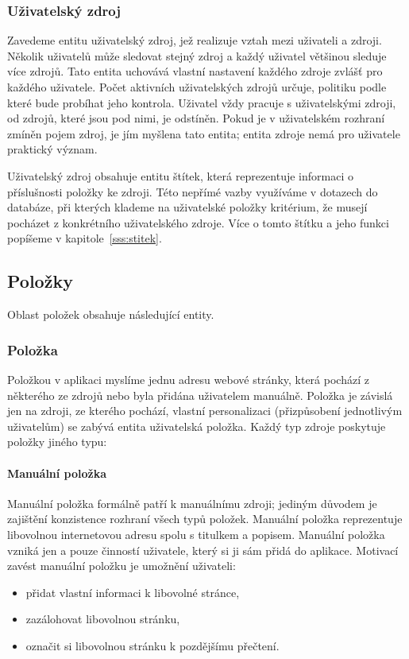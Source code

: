 \subsubsection{Uživatelský zdroj}
\label{sss:uzivatelsky-zdroj}

Zavedeme entitu uživatelský zdroj, jež realizuje vztah mezi uživateli a zdroji.
Několik uživatelů může sledovat stejný zdroj a každý uživatel většinou sleduje více zdrojů.
Tato entita uchovává vlastní nastavení každého zdroje zvlášť pro každého uživatele.
Počet aktivních uživatelských zdrojů určuje, politiku podle které bude probíhat jeho kontrola.
Uživatel vždy pracuje s uživatelskými zdroji, od zdrojů, které jsou pod nimi, je odstíněn.
Pokud je v uživatelském rozhraní zmíněn pojem zdroj, je jím myšlena tato entita; entita zdroje nemá pro uživatele praktický význam.

Uživatelský zdroj obsahuje entitu štítek, která reprezentuje informaci o příslušnosti položky ke zdroji.
Této nepřímé vazby využíváme v dotazech do databáze, při kterých klademe na uživatelské položky kritérium, že musejí pocházet z konkrétního uživatelského zdroje.
Více o tomto štítku a jeho funkci popíšeme v kapitole~\ref{sss:stitek}.

\subsection{Položky}

Oblast položek obsahuje následující entity.

\subsubsection{Položka}

Položkou v aplikaci myslíme jednu adresu webové stránky, která pochází z některého ze zdrojů nebo byla přidána uživatelem manuálně.
Položka je závislá jen na zdroji, ze kterého pochází, vlastní personalizaci (přizpůsobení jednotlivým uživatelům) se zabývá entita uživatelská položka.
Každý typ zdroje poskytuje položky jiného typu:

\paragraph{Manuální položka}

Manuální položka formálně patří k manuálnímu zdroji; jediným důvodem je zajištění konzistence rozhraní všech typů položek.
Manuální položka reprezentuje libovolnou internetovou adresu spolu s titulkem a popisem.
Manuální položka vzniká jen a pouze činností uživatele, který si ji sám přidá do aplikace.
Motivací zavést manuální položku je umožnění uživateli:
\begin{itemize}
	\item přidat vlastní informaci k libovolné stránce,
	\item zazálohovat libovolnou stránku,
	\item označit si libovolnou stránku k pozdějšímu přečtení.
\end{itemize}

